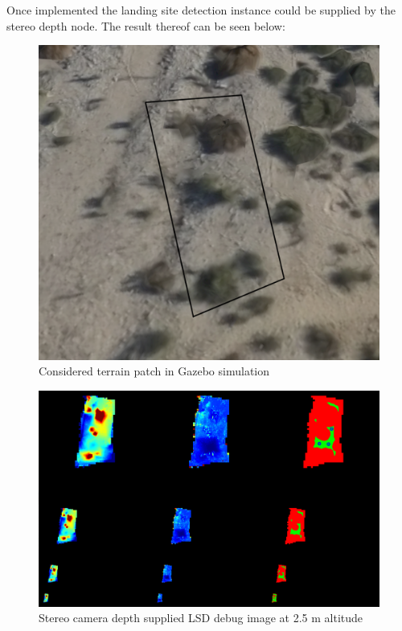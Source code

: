 Once implemented the landing site detection instance could be supplied by the stereo depth node. The result thereof can be seen below:

\begin{figure}[ht!]
    \centering
    \includegraphics[scale=0.2, angle=-12]{images/stereo_camera_depth/reference_map2.5m_annotated.png}
    \caption{Considered terrain patch in Gazebo simulation}
    \label{stereo_reference}
\end{figure}

\begin{figure}[ht!]
    \centering
    \includegraphics[scale=0.25]{images/stereo_camera_depth/stereo_2.5m.png}
    \caption{Stereo camera depth supplied LSD debug image at 2.5 m altitude}
    \label{qual_stereo_test}
\end{figure}


